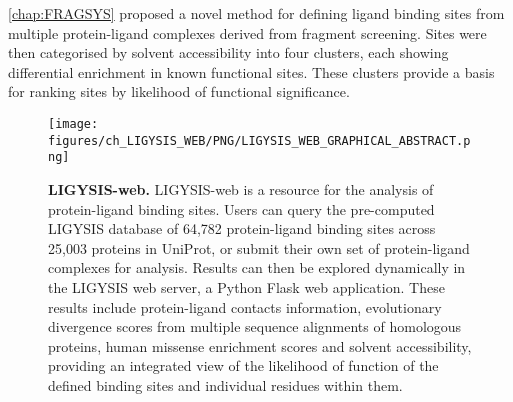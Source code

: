 
\autoref{chap:FRAGSYS} proposed a novel method for defining ligand binding sites from multiple protein-ligand complexes derived from fragment screening. Sites were then categorised by solvent accessibility into four clusters, each showing differential enrichment in known functional sites. These clusters provide a basis for ranking sites by likelihood of functional significance.

\begin{figure}[htb!]
    \centering
    \texttt{[image: figures/ch\_LIGYSIS\_WEB/PNG/LIGYSIS\_WEB\_GRAPHICAL\_ABSTRACT.png]}
    \caption[LIGYSIS-web]{\textbf{LIGYSIS-web.} LIGYSIS-web is a resource for the analysis of protein-ligand binding sites. Users can query the pre-computed LIGYSIS database of 64,782 protein-ligand binding sites across 25,003 proteins in UniProt, or submit their own set of protein-ligand complexes for analysis. Results can then be explored dynamically in the LIGYSIS web server, a Python Flask web application. These results include protein-ligand contacts information, evolutionary divergence scores from multiple sequence alignments of homologous proteins, human missense enrichment scores and solvent accessibility, providing an integrated view of the likelihood of function of the defined binding sites and individual residues within them.}
    \label{fig:LIGYSIS_WEB}
\end{figure}


